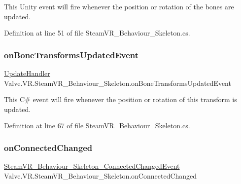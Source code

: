 This Unity event will fire whenever the position or rotation of the bones are updated. 



Definition at line 51 of file Steam\+V\+R\+\_\+\+Behaviour\+\_\+\+Skeleton.\+cs.

\mbox{\label{class_valve_1_1_v_r_1_1_steam_v_r___behaviour___skeleton_a2631717d86946b7d2d8979b60eb4fc9a}} 
\subsubsection{\texorpdfstring{onBoneTransformsUpdatedEvent}{onBoneTransformsUpdatedEvent}}
{\footnotesize\ttfamily \mbox{\hyperlink{class_valve_1_1_v_r_1_1_steam_v_r___behaviour___skeleton_aca86be067e5094667bce3ba86677dd0b}{Update\+Handler}} Valve.\+V\+R.\+Steam\+V\+R\+\_\+\+Behaviour\+\_\+\+Skeleton.\+on\+Bone\+Transforms\+Updated\+Event}



This C\# event will fire whenever the position or rotation of this transform is updated. 



Definition at line 67 of file Steam\+V\+R\+\_\+\+Behaviour\+\_\+\+Skeleton.\+cs.

\mbox{\label{class_valve_1_1_v_r_1_1_steam_v_r___behaviour___skeleton_a5b269c83dc2ddb5b08a228a33f3be367}} 
\subsubsection{\texorpdfstring{onConnectedChanged}{onConnectedChanged}}
{\footnotesize\ttfamily \mbox{\hyperlink{class_valve_1_1_v_r_1_1_steam_v_r___behaviour___skeleton___connected_changed_event}{Steam\+V\+R\+\_\+\+Behaviour\+\_\+\+Skeleton\+\_\+\+Connected\+Changed\+Event}} Valve.\+V\+R.\+Steam\+V\+R\+\_\+\+Behaviour\+\_\+\+Skeleton.\+on\+Connected\+Changed}



